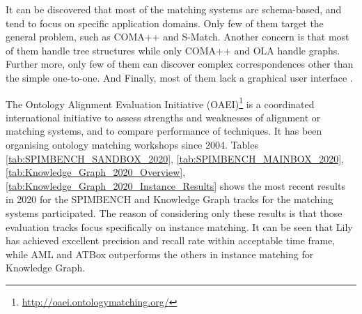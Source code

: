 It can be discovered that most of the matching systems are schema-based, and tend to focus on specific application domains. Only few of them target the general problem, such as COMA++ and S-Match. Another concern is that most of them handle tree structures while only COMA++ and OLA handle graphs. Further more, only few of them can discover complex correspondences other than the simple one-to-one. And Finally, most of them lack a graphical user interface \cite{euzenat2013d}.

The Ontology Alignment Evaluation Initiative (OAEI)\footnote{\url{http://oaei.ontologymatching.org/}} is a coordinated international initiative to assess strengths and weaknesses of alignment or matching systems, and to compare performance of techniques. It has been organising ontology matching workshops since 2004. Tables \ref{tab:SPIMBENCH_SANDBOX_2020}, \ref{tab:SPIMBENCH_MAINBOX_2020}, \ref{tab:Knowledge_Graph_2020_Overview}, \ref{tab:Knowledge_Graph_2020_Instance_Results} shows the most recent results in 2020 for the SPIMBENCH and Knowledge Graph tracks for the matching systems participated. The reason of considering only these results is that those evaluation tracks focus specifically on instance matching. It can be seen that Lily has achieved excellent precision and recall rate within acceptable time frame, while AML and ATBox outperforms the others in instance matching for Knowledge Graph.

\begin{table}[ht!]
\caption{SPIMBENCH SANDBOX 2020}
\label{tab:SPIMBENCH_SANDBOX_2020}
\end{table}

